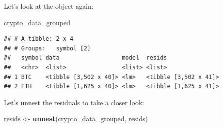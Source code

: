 \documentclass[
]{book}
\newenvironment{Shaded}{\begin{snugshade}}{\end{snugshade}}
\newcommand{\DataTypeTok}[1]{\textcolor[rgb]{0.13,0.29,0.53}{#1}}
\newcommand{\DecValTok}[1]{\textcolor[rgb]{0.00,0.00,0.81}{#1}}
\newcommand{\KeywordTok}[1]{\textcolor[rgb]{0.13,0.29,0.53}{\textbf{#1}}}
\newcommand{\NormalTok}[1]{#1}
\newcommand{\OperatorTok}[1]{\textcolor[rgb]{0.81,0.36,0.00}{\textbf{#1}}}
\newcommand{\OtherTok}[1]{\textcolor[rgb]{0.56,0.35,0.01}{#1}}
\newcommand{\StringTok}[1]{\textcolor[rgb]{0.31,0.60,0.02}{#1}}
\begin{document}
\begin{Shaded}
\end{Shaded}

Let's look at the object again:

\begin{Shaded}
\begin{Highlighting}[]
\NormalTok{crypto_data_grouped}
\end{Highlighting}
\end{Shaded}

\begin{verbatim}
## # A tibble: 2 x 4
## # Groups:   symbol [2]
##   symbol data                  model  resids               
##   <chr>  <list>                <list> <list>               
## 1 BTC    <tibble [3,502 x 40]> <lm>   <tibble [3,502 x 41]>
## 2 ETH    <tibble [1,625 x 40]> <lm>   <tibble [1,625 x 41]>
\end{verbatim}

Let's unnest the residuals to take a closer look:

\begin{Shaded}
\begin{Highlighting}[]
\NormalTok{resids <-}\StringTok{ }\KeywordTok{unnest}\NormalTok{(crypto_data_grouped, resids)}
\end{Highlighting}
\end{Shaded}

\begin{Shaded}
\end{Shaded}
\end{document}
